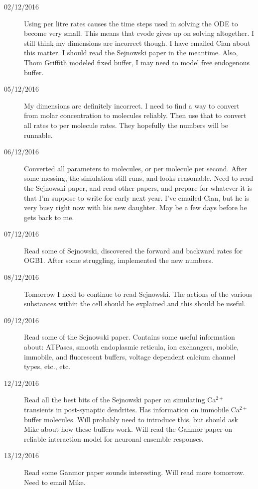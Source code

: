\documentclass[a4paper,12pt]{article}
\theoremstyle{definition}
\begin{document}
\begin{description}
	\item[02/12/2016] Using per litre rates causes the time steps used in solving the ODE to become very small. This means that cvode gives up on solving altogether. I still think my dimensions are incorrect though. I have emailed Cian about this matter. I should read the Sejnowski paper in the meantime. Also, Thom Griffith modeled fixed buffer, I may need to model free endogenous buffer.

	\item[05/12/2016] My dimensions are definitely incorrect. I need to find a way to convert from molar concentration to molecules reliably. Then use that to convert all rates to per molecule rates. They hopefully the numbers will be runnable.

	\item[06/12/2016] Converted all parameters to molecules, or per molecule per second. After some messing, the simulation still runs, and looks reasonable. Need to read the Sejnowski paper, and read other papers, and prepare for whatever it is that I'm suppose to write for early next year. I've emailed Cian, but he is very busy right now with his new daughter. May be a few days before he gets back to me.

	\item[07/12/2016] Read some of Sejnowski, discovered the forward and backward rates for OGB1. After some struggling, implemented the new numbers.

	\item[08/12/2016] Tomorrow I need to continue to read Sejnowski. The actions of the various substances within the cell should be explained and this should be useful.

	\item[09/12/2016] Read some of the Sejnowski paper. Contains some useful information about: ATPases, smooth endoplasmic reticula, ion exchangers, mobile, immobile, and fluorescent buffers, voltage dependent calcium channel types, etc., etc.

	\item[12/12/2016] Read all the best bits of the Sejnowski paper on simulating Ca$^{2+}$ transients in post-synaptic dendrites. Has information on immobile Ca$^{2+}$ buffer molecules. Will probably need to introduce this, but should ask Mike about how these buffers work. Will read the Ganmor paper on reliable interaction model for neuronal ensemble responses.

	\item[13/12/2016] Read some Ganmor paper sounds interesting. Will read more tomorrow. Need to email Mike.


\end{description}
\end{document}
